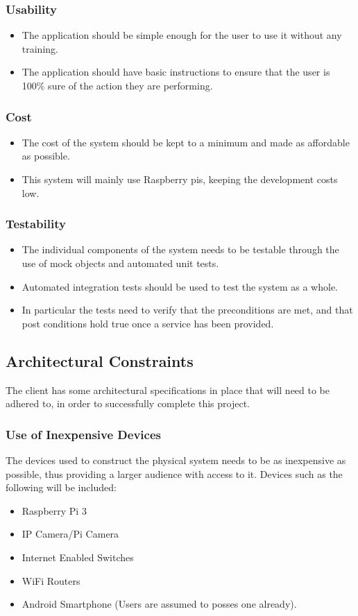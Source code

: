 \documentclass[a4paper,12pt]{article}
\begin{document}
	\subsubsection{Usability}
	\begin{itemize}
		\item The application should be simple enough for the user to use it without any training. 
		\item The application should have basic instructions to ensure that the user is 100\% sure of the action they are performing.
	\end{itemize}
	
	\subsubsection{Cost}
	\begin{itemize}
		\item The cost of the system should be kept to a minimum and made as affordable as possible. 
		\item This system will mainly use Raspberry pis, keeping the development costs low. 
	\end{itemize}
	
	
	\subsubsection{Testability}
	\begin{itemize}
		\item The individual components of the system needs to be testable through the use of mock objects and automated unit tests.
		\item Automated integration tests should be used to test the system as a whole.
		\item In particular the tests need to verify that the preconditions are met, and that post conditions hold true once a service has been provided.
	\end{itemize}
	
	\subsection{Architectural Constraints}
	The client has some architectural specifications in place that will need to be adhered to, in order to successfully complete this project.
	
	\subsubsection{Use of Inexpensive Devices}
	The devices used to construct the physical system needs to be as inexpensive as possible, thus providing a larger audience with access to it. Devices such as the following will be included:
	\begin{itemize}
		\item Raspberry Pi 3
		\item IP Camera/Pi Camera
		\item Internet Enabled Switches
		\item WiFi Routers
		\item Android Smartphone (Users are assumed to posses one already).
	\end{itemize}
	
\end{document}
